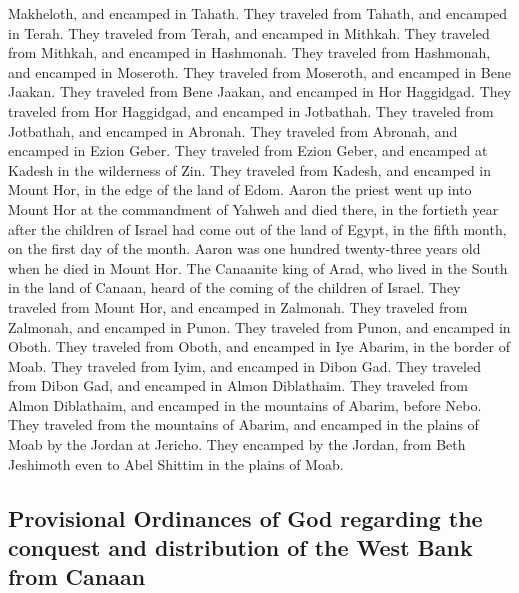 Makheloth, and encamped in Tahath.  They traveled from
Tahath, and encamped in Terah.  They traveled from Terah,
and encamped in Mithkah.  They traveled from Mithkah, and
encamped in Hashmonah.  They traveled from Hashmonah, and
encamped in Moseroth.  They traveled from Moseroth, and
encamped in Bene Jaakan.  They traveled from Bene Jaakan,
and encamped in Hor Haggidgad.  They traveled from Hor
Haggidgad, and encamped in Jotbathah.  They traveled from
Jotbathah, and encamped in Abronah.  They traveled from
Abronah, and encamped in Ezion Geber.  They traveled from
Ezion Geber, and encamped at Kadesh in the wilderness of Zin.
 They traveled from Kadesh, and encamped in Mount Hor, in
the edge of the land of Edom.  Aaron the priest went up
into Mount Hor at the commandment of Yahweh and died there, in the
fortieth year after the children of Israel had come out of the land of
Egypt, in the fifth month, on the first day of the month.
 Aaron was one hundred twenty-three years old when he
died in Mount Hor.  The Canaanite king of Arad, who lived
in the South in the land of Canaan, heard of the coming of the children
of Israel.  They traveled from Mount Hor, and encamped in
Zalmonah.  They traveled from Zalmonah, and encamped in
Punon.  They traveled from Punon, and encamped in Oboth.
 They traveled from Oboth, and encamped in Iye Abarim, in
the border of Moab.  They traveled from Iyim, and
encamped in Dibon Gad.  They traveled from Dibon Gad, and
encamped in Almon Diblathaim.  They traveled from Almon
Diblathaim, and encamped in the mountains of Abarim, before Nebo.
 They traveled from the mountains of Abarim, and encamped
in the plains of Moab by the Jordan at Jericho.  They
encamped by the Jordan, from Beth Jeshimoth even to Abel Shittim in the
plains of Moab.

\hypertarget{provisional-ordinances-of-god-regarding-the-conquest-and-distribution-of-the-west-bank-from-canaan}{%
\subsection{Provisional Ordinances of God regarding the conquest and
distribution of the West Bank from
Canaan}\label{provisional-ordinances-of-god-regarding-the-conquest-and-distribution-of-the-west-bank-from-canaan}}

